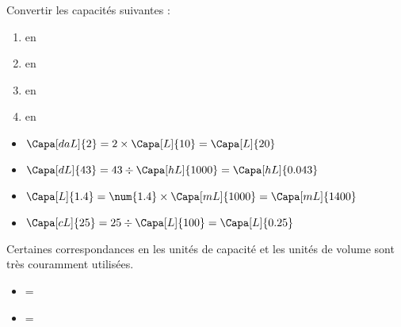\begin{methode*1}
\begin{changemargin}{0mm}{-27mm}
\begin{center}
            \vspace*{-10mm}
        \end{center}
    \end{changemargin}
    \exercice
    Convertir les capacités suivantes :
    \begin{enumerate}
        \item {} en \Capa[L]{}
        \item {} en \Capa[hL]{}
        \item {} en \Capa[mL]{}
        \item {} en \Capa[L]{}
    \end{enumerate}
    \correction
    \begin{itemize}
        \item $\Capa[daL]{2}=2\times \Capa[L]{10}=\Capa[L]{20}$
        \item $\Capa[dL]{43}=43\div \Capa[hL]{1000}=\Capa[hL]{0.043}$
        \item $\Capa[L]{1.4}=\num{1.4}\times\Capa[mL]{1000}=\Capa[mL]{1400}$
        \item $\Capa[cL]{25}=25\div\Capa[L]{100}=\Capa[L]{0.25}$
    \end{itemize}
\end{methode*1}

\begin{propriete}
    Certaines correspondances en les unités de capacité et les unités de volume sont très couramment utilisées.
    \begin{itemize}
        \item {}=
        \item {}=
    \end{itemize}
\end{propriete}